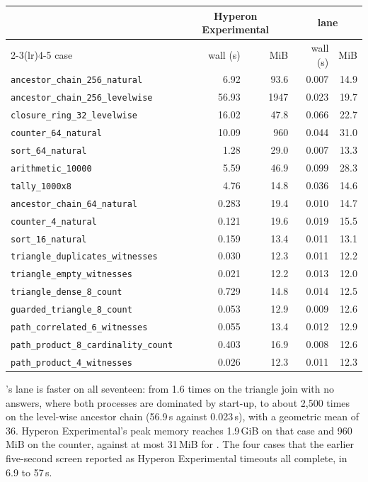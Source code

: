 \begin{center}
\small
\setlength{\tabcolsep}{4pt}
\begin{tabular}{@{}lrrrr@{}}
\toprule
 & \multicolumn{2}{c}{Hyperon Experimental} & \multicolumn{2}{c}{\CeTTa{} \HE{} lane} \\
\cmidrule(lr){2-3}\cmidrule(lr){4-5}
case & wall (s) & MiB & wall (s) & MiB \\
\midrule
\nolinkurl{ancestor_chain_256_natural} & 6.92 & 93.6 & 0.007 & 14.9 \\
\nolinkurl{ancestor_chain_256_levelwise} & 56.93 & 1947 & 0.023 & 19.7 \\
\nolinkurl{closure_ring_32_levelwise} & 16.02 & 47.8 & 0.066 & 22.7 \\
\nolinkurl{counter_64_natural} & 10.09 & 960 & 0.044 & 31.0 \\
\nolinkurl{sort_64_natural} & 1.28 & 29.0 & 0.007 & 13.3 \\
\nolinkurl{arithmetic_10000} & 5.59 & 46.9 & 0.099 & 28.3 \\
\nolinkurl{tally_1000x8} & 4.76 & 14.8 & 0.036 & 14.6 \\
\nolinkurl{ancestor_chain_64_natural} & 0.283 & 19.4 & 0.010 & 14.7 \\
\nolinkurl{counter_4_natural} & 0.121 & 19.6 & 0.019 & 15.5 \\
\nolinkurl{sort_16_natural} & 0.159 & 13.4 & 0.011 & 13.1 \\
\nolinkurl{triangle_duplicates_witnesses} & 0.030 & 12.3 & 0.011 & 12.2 \\
\nolinkurl{triangle_empty_witnesses} & 0.021 & 12.2 & 0.013 & 12.0 \\
\nolinkurl{triangle_dense_8_count} & 0.729 & 14.8 & 0.014 & 12.5 \\
\nolinkurl{guarded_triangle_8_count} & 0.053 & 12.9 & 0.009 & 12.6 \\
\nolinkurl{path_correlated_6_witnesses} & 0.055 & 13.4 & 0.012 & 12.9 \\
\nolinkurl{path_product_8_cardinality_count} & 0.403 & 16.9 & 0.008 & 12.6 \\
\nolinkurl{path_product_4_witnesses} & 0.026 & 12.3 & 0.011 & 12.3 \\
\bottomrule
\end{tabular}
\end{center}

\CeTTa{}'s \HE{} lane is faster on all seventeen: from 1.6 times on the
triangle join with no answers, where both processes are dominated by start-up,
to about 2,500
times on the level-wise ancestor chain (56.9\,s against 0.023\,s), with a
geometric mean of 36.  Hyperon Experimental's peak memory reaches 1.9\,GiB on
that case and 960\,MiB on the counter, against at most 31\,MiB for \CeTTa{}.
The four cases that the earlier five-second screen reported as Hyperon
Experimental timeouts all complete, in 6.9 to 57\,s.

